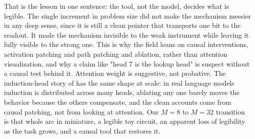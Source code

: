 That is the lesson in one sentence: the tool, not the model, decides what is
legible. The single increment in problem size did not make the mechanism messier
in any deep sense, since it is still a clean pointer that transports one bit to
the readout. It made the mechanism invisible to the weak instrument while leaving
it fully visible to the strong one. This is why the field leans on causal
interventions, activation patching and path patching and ablation, rather than
attention visualization, and why a claim like "head 7 is the lookup head" is
suspect without a causal test behind it. Attention weight is suggestive, not
probative. The induction-head story of  has the same
shape at scale: in real language models induction is distributed across many
heads, ablating any one barely moves the behavior because the others compensate,
and the clean accounts come from causal patching, not from looking at attention.
Our $M = 8$ to $M = 32$ transition is that whole arc in miniature, a legible toy
circuit, an apparent loss of legibility as the task grows, and a causal tool that
restores it.
